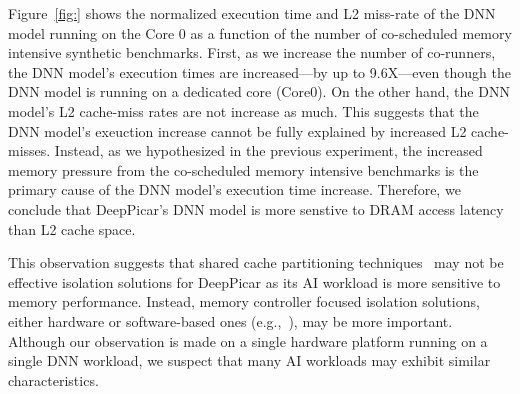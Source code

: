 Figure~\ref{fig:} shows the normalized execution time and L2 miss-rate
of the DNN model running on the Core 0 as a function of the number of
co-scheduled memory intensive synthetic benchmarks. First, as we
increase the number of co-runners, the DNN model's execution times are
increased---by up to 9.6X---even though the DNN model is running on a
dedicated core (Core0). On the other hand, the DNN model's L2
cache-miss rates are not increase as much. This suggests that
the DNN model's exeuction increase cannot be fully explained by
increased L2 cache-misses. Instead, as we hypothesized in the previous
experiment, the increased memory pressure from the co-scheduled memory
intensive benchmarks is the primary cause of the DNN model's execution
time increase. Therefore, we conclude that DeepPicar's DNN model is
more senstive to DRAM access latency than L2 cache space.

This observation suggests that shared cache partitioning
techniques~\cite{Gracioli2015,Kim2016} may not be effective isolation
solutions for DeepPicar as its AI workload is more sensitive to memory
performance. Instead, memory controller focused isolation solutions,
either hardware or software-based ones (e.g.,~\cite{Guo2017,Yun2013}),
may be more important. Although our observation is made on a single
hardware platform running on a single DNN workload, we suspect that
many AI workloads may exhibit similar characteristics.



